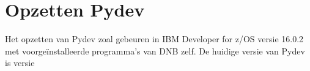 
\chapter{Opzetten Pydev}
\label{ch:opzetten-pydev}
Het opzetten van Pydev zoal gebeuren in IBM Developer for z/OS versie 16.0.2 met voorgeïnstalleerde programma's van DNB zelf. De huidige versie van Pydev is versie